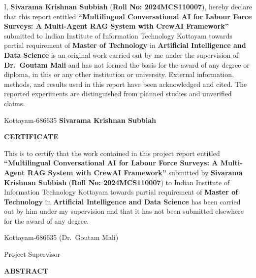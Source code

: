 \documentclass[12pt,a4paper]{report}
\theoremstyle{plain}
\theoremstyle{definition}
\theoremstyle{remark}
\begin{document}
\noindent I, \textbf{Sivarama Krishnan Subbiah} (\textbf{Roll No: 2024MCS110007}),
hereby declare that this report entitled
\textbf{``Multilingual Conversational AI for Labour Force Surveys:
A Multi-Agent RAG System with CrewAI Framework''} submitted to Indian
Institute of Information Technology Kottayam towards partial
requirement of {\bf Master of Technology} in \textbf{Artificial Intelligence
and Data Science}
is an original work carried out by me under the supervision of
\textbf{Dr.\ Goutam Mali} and has not formed the basis for the award
of any degree or diploma, in this or any other institution or
university. External information, methods, and results used in this
report have been acknowledged and cited. The reported experiments are
distinguished from planned studies and unverified claims.

\vspace{4cm}

\noindent Kottayam-686635 \hfill \textbf{Sivarama Krishnan Subbiah}


\clearpage

 \setcounter{page}{3}
\begin{center}
{\large{\bf{CERTIFICATE}}}
\end{center}

\noindent This is to certify that the work contained in this
project report entitled \textbf{``Multilingual Conversational AI for
Labour Force Surveys: A Multi-Agent RAG System with CrewAI Framework''}
submitted by \textbf{Sivarama Krishnan Subbiah}
(\textbf{Roll No: 2024MCS110007}) to Indian Institute of Information
Technology Kottayam towards partial requirement of {\bf Master of Technology}
in \textbf{Artificial Intelligence and Data Science}
has been carried out by him under my supervision and that it has not been
submitted elsewhere for the award of any degree.

\vspace{4cm}

\noindent Kottayam-686635  \hfill (Dr.\ Goutam Mali)

 \hfill Project Supervisor

\clearpage

\begin{center}
{\Large{\bf{ABSTRACT}}}
\end{center}
\end{document}
